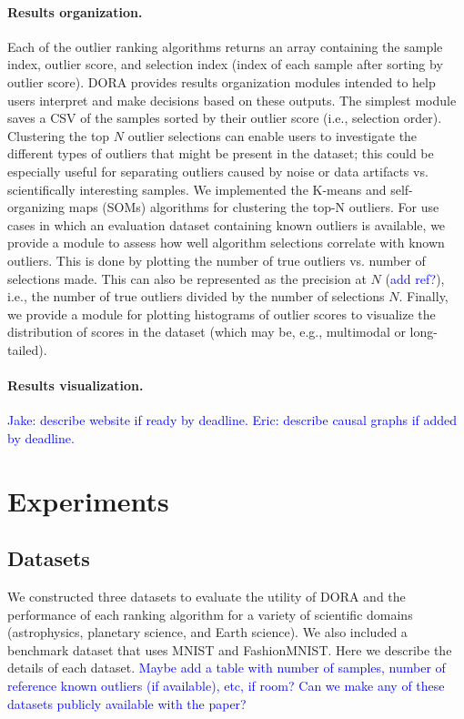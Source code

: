 \documentclass[letterpaper]{article} %
\newcommand{\todo}[1]{\textcolor{blue}{#1}}
\begin{document}
\paragraph{Results organization.} 
Each of the outlier ranking algorithms returns an array containing the sample
index, outlier score, and selection index (index of each sample after sorting
by outlier score). DORA provides results organization modules intended to help
 users interpret and make decisions based on these outputs. The simplest 
 module saves a CSV of the samples sorted by their outlier score 
 (i.e., selection order). Clustering the top
  $N$ outlier selections can enable users to investigate the different types of 
 outliers that might be present in the dataset; this could be especially useful
 for separating outliers caused by noise or data artifacts vs. scientifically 
 interesting samples. We implemented the K-means and self-organizing maps 
 (SOMs) algorithms for clustering the top-N outliers. For use cases in which an
 evaluation dataset containing known outliers is available, we provide a module
 to assess how well algorithm selections correlate with known outliers. This is
 done by plotting the number of true outliers vs. number of selections made. 
 This can also be represented as the precision at $N$ (\todo{add ref?}), i.e., 
 the number of true outliers divided by the number of selections $N$. Finally,
 we provide a module for plotting histograms of outlier scores to visualize the
 distribution of scores in the dataset (which may be, e.g., multimodal or 
 long-tailed).

\paragraph{Results visualization.} 
\todo{Jake: describe website if ready by deadline.}
\todo{Eric: describe causal graphs if added by deadline.}

\section{Experiments}

\subsection{Datasets}
We constructed three datasets to evaluate the utility of DORA and the
performance of each ranking algorithm for a variety of scientific domains
 (astrophysics, planetary science, and Earth science). We also included a 
 benchmark dataset that uses MNIST and FashionMNIST. Here we describe
 the details of each dataset.
\todo{Maybe add
 a table with number of samples, number of reference known outliers (if 
 available), etc, if room? }
 \todo{Can we make any of these datasets publicly available with the paper?}
\end{document}
